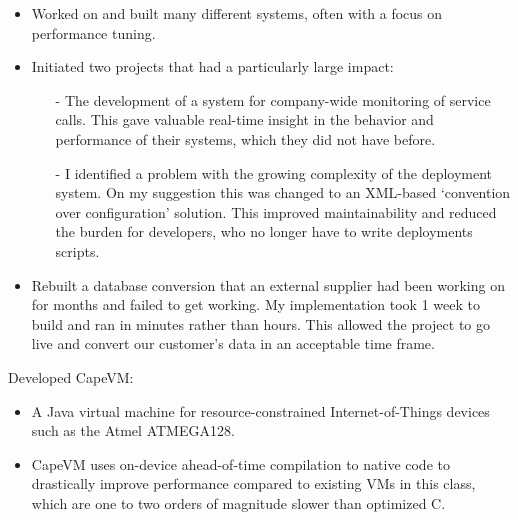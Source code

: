 \documentclass[10pt,a4paper]{../altacv}
\begin{document}
\begin{itemize}
	\item\small{Worked on and built many different systems, often with a focus on performance tuning.}
	\item\small{Initiated two projects that had a particularly large impact:
	\begin{itemize}
		\item[-]\small{The development of a system for company-wide monitoring of service calls. This gave valuable real-time insight in the behavior and performance of their systems, which they did not have before.}
		\item[-]\small{I identified a problem with the growing complexity of the deployment system. On my suggestion this was changed to an XML-based ‘convention over configuration' solution. This improved maintainability and reduced the burden for developers, who no longer have to write deployments scripts.}
	\end{itemize}
	}
	\item\small{Rebuilt a database conversion that an external supplier had been working on for months and failed to get working. My implementation took 1 week to build and ran in minutes rather than hours. This allowed the project to go live and convert our customer's data in an acceptable time frame.}
\end{itemize}

\medskip
\medskip

\begin{comment}
\cvevent{Postdoctoral Researcher}{Academia Sinica}{Mar 2020 -- May 2021}{Taipei, Taiwan}
Research on disinformation.
\cvtag{Golang}
\cvtag{HTML}
\cvtag{CSS}
\cvevent{Postdoctoral Researcher}{National Taiwan University}{Feb 2019 -- Aug 2019}{Taipei, Taiwan}
Blockchain

\medskip
\medskip
\end{comment}


Developed CapeVM:
\begin{itemize}
    \item\small{A Java virtual machine for resource-constrained Internet-of-Things devices such as the Atmel ATMEGA128.}
    \item\small{CapeVM uses on-device ahead-of-time compilation to native code to drastically improve performance compared to existing VMs in this class, which are one to two orders of magnitude slower than optimized C.}
\end{itemize}
\end{document}
